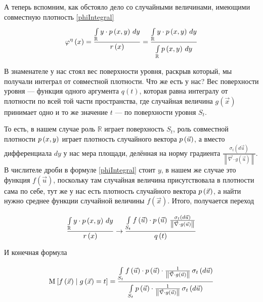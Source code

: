 А теперь вспомним, как обстояло дело со случайными величинами,
имеющими совместную плотность \eqref{phiIntegral}
$$\varphi^{\eta}\left( x \right)
    = \frac{\integral{\mathbb{R}}{}{y}{y \cdot \pdf{x,y}}}
        {r\left( x \right)}
    = \frac{\integral{\mathbb{R}}{}{y}{y \cdot \pdf{x,y}}}
        {\integral{\mathbb{R}}{}{y}{\pdf{x,y}}}$$

В знаменателе у нас стоял вес поверхности уровня,
раскрыв который, мы получали интеграл от совместной плотности.
Что же есть у нас?
Вес поверхности уровня --- функция одного аргумента $q\left( t \right)$,
которая равна интегралу от плотности по всей той части пространства,
где случайная величина $g\left( \vec{x} \right)$
принимает одно и то же значение $t$ --- по поверхности уровня $S_t$.

То есть, в нашем случае роль $\mathbb{R}$ играет поверхность $S_t$,
роль совместной плотности $\pdf{x,y}$ играет плотность случайного вектора
$\pdf{\vec{u}}$, а вместо дифференциала $dy$ у нас мера площади,
делённая на норму градиента $\frac{\sigma_{t}\left( d\vec{u} \right)}
{\left\| \vec{\nabla} \cdot g\left( \vec{u} \right) \right\|}$.
В числителе дроби в формуле \eqref{phiIntegral} стоит $y$,
в нашем же случае это функция $f\left( \vec{u} \right)$,
поскольку там случайная величина присутствовала в плотности сама по себе,
тут же у нас есть плотность случайного вектора $\pdf{\vec{x}}$,
а найти нужно среднее функции случайной величины $f\left( \vec{x} \right)$.
Итого, получается переход

$$\frac{\integral{\mathbb{R}}{}{y}{y \cdot \pdf{x,y}}}{r\left( x \right)}
    \rightarrow
        \frac{\integrall{S_t}{\frac{\sigma_{t}\left( d\vec{u} \right)}{
            \left\| \vec{\nabla} \cdot g\left( \vec{u} \right) \right\|}}{
            f\left( \vec{u} \right) \cdot \pdf{\vec{u}}}}{q\left( t \right)}$$

И конечная формула

$$\Mean{ f\left( \vec{x} \right) \mcond g\left( \vec{x} \right) = t }
    = \frac{\integrall{S_t}{\sigma_{t}\left(d\vec{u} \right)}{
        f\left( \vec{u} \right) \cdot \pdf{\vec{u}} \cdot \frac{1}{
            \left\| \vec{\nabla} \cdot g\left( \vec{u} \right) \right\|}}}
        {\integrall{S_t}{\sigma_{t}\left(d\vec{u} \right)}{
            \pdf{\vec{u}} \cdot \frac{1}{
                \left\| \vec{\nabla} \cdot g\left( \vec{u} \right) \right\|}}}$$


